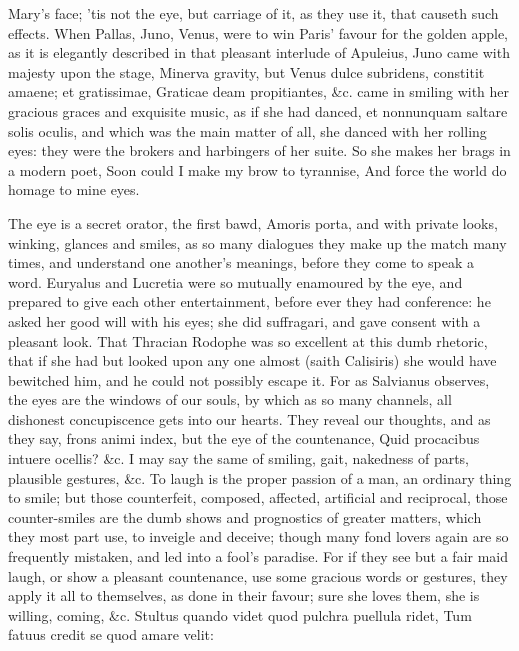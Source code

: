 {Mary's face; 'tis not the eye, but carriage of it, as they use it, that
causeth such effects. When Pallas, Juno, Venus, were to win Paris'
favour for the golden apple, as it is elegantly described in that
pleasant interlude of Apuleius, Juno came with majesty upon the
stage, Minerva gravity, but Venus dulce subridens, constitit amaene; et
gratissimae, Graticae deam propitiantes, \&c. came in smiling with her
gracious graces and exquisite music, as if she had danced, et
nonnunquam saltare solis oculis, and which was the main matter of all,
she danced with her rolling eyes: they were the brokers and harbingers
of her suite. So she makes her brags in a modern poet,
Soon could I make my brow to tyrannise,
And force the world do homage to mine eyes.

The eye is a secret orator, the first bawd, Amoris porta, and with
private looks, winking, glances and smiles, as so many dialogues they
make up the match many times, and understand one another's meanings,
before they come to speak a word. Euryalus and Lucretia were so
mutually enamoured by the eye, and prepared to give each other
entertainment, before ever they had conference: he asked her good will
with his eyes; she did suffragari, and gave consent with a pleasant
look. That Thracian Rodophe was so excellent at this dumb
rhetoric, that if she had but looked upon any one almost (saith
Calisiris) she would have bewitched him, and he could not possibly
escape it. For as Salvianus observes, the eyes are the windows of
our souls, by which as so many channels, all dishonest concupiscence
gets into our hearts. They reveal our thoughts, and as they say, frons
animi index, but the eye of the countenance, Quid procacibus
intuere ocellis? \&c. I may say the same of smiling, gait, nakedness of
parts, plausible gestures, \&c. To laugh is the proper passion of a man,
an ordinary thing to smile; but those counterfeit, composed, affected,
artificial and reciprocal, those counter-smiles are the dumb shows and
prognostics of greater matters, which they most part use, to inveigle
and deceive; though many fond lovers again are so frequently mistaken,
and led into a fool's paradise. For if they see but a fair maid laugh,
or show a pleasant countenance, use some gracious words or gestures,
they apply it all to themselves, as done in their favour; sure she
loves them, she is willing, coming, \&c.
Stultus quando videt quod pulchra puellula ridet,
Tum fatuus credit se quod amare velit:

}
